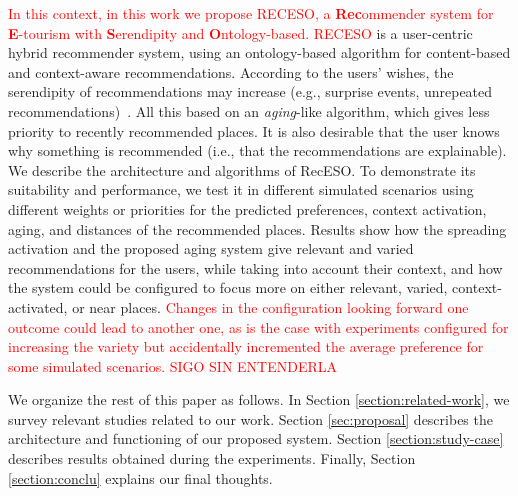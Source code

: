 \textcolor{red}{In this context, in this work we propose RECESO, a {\bf Rec}ommender system for {\bf E}-tourism with {\bf S}erendipity and {\bf O}ntology-based. RECESO} is
a user-centric hybrid recommender system, using an ontology-based algorithm for content-based and context-aware recommendations. According to the users’ wishes, the serendipity of recommendations may increase (e.g., surprise events, unrepeated recommendations)~\cite{kotkov2016survey}. All this based on an {\it aging}-like algorithm, which gives less priority to recently recommended places.  It is also desirable that the user knows why something is recommended (i.e., that the recommendations are explainable). We describe the architecture and algorithms of RecESO.
To demonstrate its suitability and performance, we test it in different simulated scenarios using different weights or priorities for the predicted preferences, context activation, aging, and distances of the recommended places. Results show how the spreading activation and the proposed aging system give relevant and varied recommendations for the users, while taking into account their context, and how the system could be configured to focus more on either relevant, varied, context-activated, or near places. \textcolor{red}{Changes in the configuration looking forward one outcome could lead to another one, as is the case with experiments configured for increasing
the variety but accidentally incremented the average preference for some simulated scenarios. SIGO SIN ENTENDERLA}

We organize the rest of this paper as follows. In Section \ref{section:related-work}, we survey 
relevant studies related to our work.
Section \ref{sec:proposal} describes the architecture and functioning of our proposed system. Section \ref{section:study-case} describes results obtained during the experiments. Finally, Section \ref{section:conclu} explains our final thoughts.



